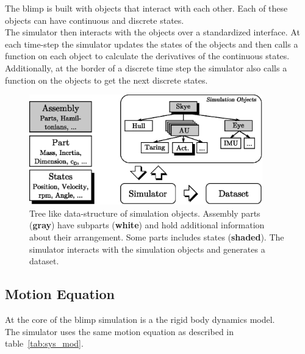 The blimp is built with objects that interact with each other.
Each of these objects can have continuous and discrete states.\\
The simulator then interacts with the objects over a standardized interface.
At each time-step the simulator updates the states of the objects and then calls a function on each object to calculate the derivatives of the continuous states.
Additionally, at the border of a discrete time step the simulator also calls a function on the objects to get the next discrete states.\\

\begin{figure}[htbp]
\centering
\includegraphics[width=0.9\textwidth]{images/sim/sim_tree.eps}
\caption{Tree like data-structure of simulation objects. Assembly parts (\textbf{gray}) have subparts (\textbf{white}) and hold additional information about their arrangement. Some parts includes states (\textbf{shaded}). The simulator interacts with the simulation objects and generates a dataset.}
\label{fig:sim_tree}
\end{figure}

\subsection{Motion Equation}
\label{sub:motion_equation}
At the core of the blimp simulation is a the rigid body dynamics model. \\
The simulator uses the same motion equation as described in table~\ref{tab:sys_mod}.\\

